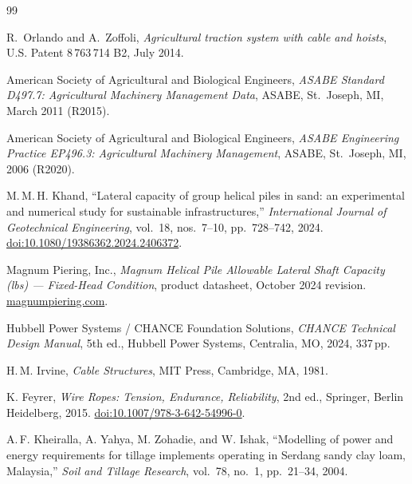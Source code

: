 \documentclass[11pt,a4paper]{article}
\begin{document}
\begin{thebibliography}{99}\setlength{\itemsep}{0.18em}

R.~Orlando and A.~Zoffoli,
\emph{Agricultural traction system with cable and hoists},
U.S. Patent 8\,763\,714 B2, July 2014.

American Society of Agricultural and Biological Engineers,
\emph{ASABE Standard D497.7: Agricultural Machinery Management Data},
ASABE, St.\ Joseph, MI, March 2011 (R2015).

American Society of Agricultural and Biological Engineers,
\emph{ASABE Engineering Practice EP496.3: Agricultural Machinery Management},
ASABE, St.\ Joseph, MI, 2006 (R2020).

M.\,M.\,H. Khand,
``Lateral capacity of group helical piles in sand: an experimental and numerical study for sustainable infrastructures,''
\emph{International Journal of Geotechnical Engineering}, vol.~18, nos.~7--10, pp.~728--742, 2024.
\href{https://doi.org/10.1080/19386362.2024.2406372}{doi:10.1080/19386362.2024.2406372}.

Magnum Piering, Inc.,
\emph{Magnum Helical Pile Allowable Lateral Shaft Capacity (lbs) --- Fixed-Head Condition},
product datasheet, October 2024 revision.
\href{https://magnumpiering.com/wp-content/uploads/2024/10/Lateral\%20Shaft\%20Capacity\%20Fixed.pdf}{magnumpiering.com}.

Hubbell Power Systems / CHANCE Foundation Solutions,
\emph{CHANCE Technical Design Manual}, 5th ed.,
Hubbell Power Systems, Centralia, MO, 2024, 337\,pp.

H.\,M. Irvine,
\emph{Cable Structures},
MIT Press, Cambridge, MA, 1981.

K. Feyrer,
\emph{Wire Ropes: Tension, Endurance, Reliability}, 2nd ed.,
Springer, Berlin Heidelberg, 2015.
\href{https://doi.org/10.1007/978-3-642-54996-0}{doi:10.1007/978-3-642-54996-0}.

A.\,F. Kheiralla, A. Yahya, M. Zohadie, and W. Ishak,
``Modelling of power and energy requirements for tillage implements operating in Serdang sandy clay loam, Malaysia,''
\emph{Soil and Tillage Research}, vol.~78, no.~1, pp.~21--34, 2004.


\end{thebibliography}
\end{document}
